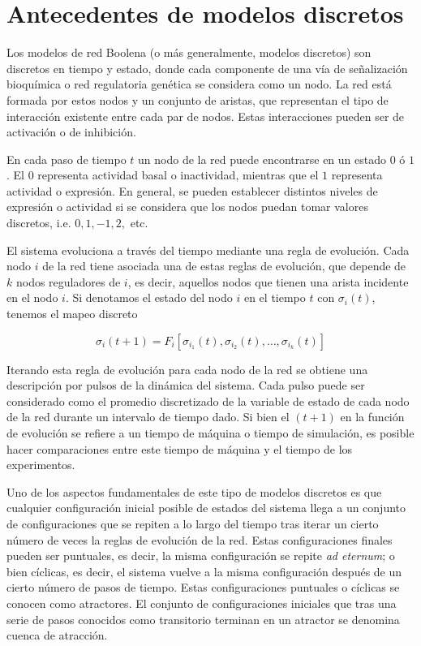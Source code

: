 \section{Antecedentes de modelos discretos}

Los modelos de red Boolena (o más generalmente, modelos discretos) son discretos en tiempo y estado, donde cada componente de una vía de señalización  bioquímica o red regulatoria genética se considera como un nodo. La red está formada por estos nodos y un conjunto de aristas, que representan el tipo de interacción existente entre cada par de nodos. Estas interacciones pueden ser de activación o de inhibición. 

En cada paso de tiempo $t$ un nodo de la red puede encontrarse en un estado $0$ ó $1$. El $0$ representa actividad basal o inactividad, mientras que el $1$ representa actividad o expresión. En general, se pueden establecer distintos niveles de expresión o actividad si se considera que los nodos puedan tomar valores discretos, i.e. $0, 1, -1, 2,$ etc.

El sistema evoluciona a través del tiempo mediante una regla de evolución. Cada nodo $i$ de la red tiene asociada una de estas reglas de evolución,  que depende de $k$ nodos reguladores de $i$, es decir, aquellos nodos que tienen una arista incidente en el nodo $i$. Si denotamos el estado del nodo $i$ en el tiempo $t$ con $\sigma_i(t)$, tenemos el mapeo discreto

\begin{equation}\label{eqn:kaufman}
\sigma_i(t+1) = F_i[\sigma_{i_1}(t), \sigma_{i_2}(t),\ldots, \sigma_{i_k}(t)]
\end{equation}

Iterando esta regla de evolución para cada nodo de la red se obtiene una descripción por pulsos de la dinámica del sistema. Cada pulso puede ser considerado como el promedio discretizado de la variable de estado de cada nodo de la red durante un intervalo de tiempo dado. Si bien el $(t+1)$ en la función de evolución se refiere a un tiempo de máquina o tiempo de simulación, es posible hacer comparaciones entre este tiempo de máquina y el tiempo de los experimentos.

Uno de los aspectos fundamentales de este tipo de modelos discretos es que cualquier configuración inicial posible de estados del sistema llega a un conjunto de configuraciones que se repiten a lo largo del tiempo tras iterar un cierto número de veces la reglas de evolución de la red. Estas configuraciones finales pueden ser puntuales, es decir, la misma configuración se repite \emph{ad eternum}; o bien cíclicas, es decir, el sistema vuelve a la misma configuración después de un cierto número de pasos de tiempo. Estas configuraciones puntuales o cíclicas se conocen como atractores. El conjunto de configuraciones iniciales que  tras una serie de pasos conocidos como transitorio terminan en un atractor se denomina cuenca de atracción.

